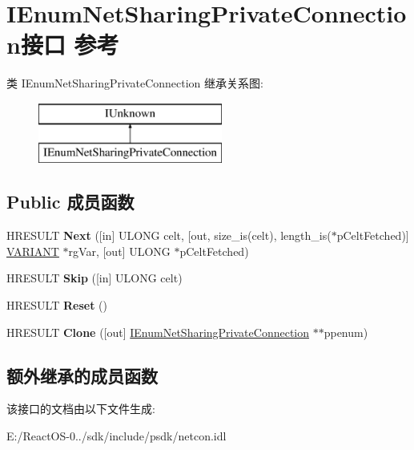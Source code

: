 \hypertarget{interface_i_enum_net_sharing_private_connection}{}\section{I\+Enum\+Net\+Sharing\+Private\+Connection接口 参考}
\label{interface_i_enum_net_sharing_private_connection}
类 I\+Enum\+Net\+Sharing\+Private\+Connection 继承关系图\+:\begin{figure}[H]
\begin{center}
\leavevmode
\includegraphics[height=2.000000cm]{interface_i_enum_net_sharing_private_connection}
\end{center}
\end{figure}
\subsection*{Public 成员函数}
\begin{DoxyCompactItemize}
\item 
\mbox{\label{interface_i_enum_net_sharing_private_connection_ac555000aef3c2b2d38f901ece8b6c32b}} 
H\+R\+E\+S\+U\+LT {\bfseries Next} (\mbox{[}in\mbox{]} U\+L\+O\+NG celt, \mbox{[}out, size\+\_\+is(celt), length\+\_\+is($\ast$p\+Celt\+Fetched)\mbox{]} \hyperlink{structtag_v_a_r_i_a_n_t}{V\+A\+R\+I\+A\+NT} $\ast$rg\+Var, \mbox{[}out\mbox{]} U\+L\+O\+NG $\ast$p\+Celt\+Fetched)
\item 
\mbox{\label{interface_i_enum_net_sharing_private_connection_a7ed1e370f68565abc23dc0e5cb61d093}} 
H\+R\+E\+S\+U\+LT {\bfseries Skip} (\mbox{[}in\mbox{]} U\+L\+O\+NG celt)
\item 
\mbox{\label{interface_i_enum_net_sharing_private_connection_a02f78625122eac46abd8e9d5f27be875}} 
H\+R\+E\+S\+U\+LT {\bfseries Reset} ()
\item 
\mbox{\label{interface_i_enum_net_sharing_private_connection_a6d7d727f3611ace9cf4dffd12057bdb1}} 
H\+R\+E\+S\+U\+LT {\bfseries Clone} (\mbox{[}out\mbox{]} \hyperlink{interface_i_enum_net_sharing_private_connection}{I\+Enum\+Net\+Sharing\+Private\+Connection} $\ast$$\ast$ppenum)
\end{DoxyCompactItemize}
\subsection*{额外继承的成员函数}


该接口的文档由以下文件生成\+:\begin{DoxyCompactItemize}
\item 
E\+:/\+React\+O\+S-\/0../sdk/include/psdk/netcon.\+idl\end{DoxyCompactItemize}
